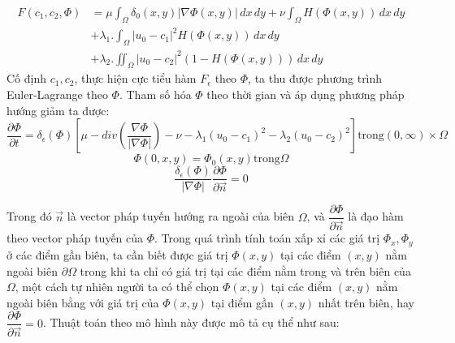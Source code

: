 \documentclass[12pt,oneside,a4]{report}
\begin{document}
\begin{equation}
\begin{split}
F(c_1, c_2, \Phi)&=\mu \int_{\Omega}\delta_0(x,y)|\nabla \Phi(x,y)|\,dx\,dy+\nu  \int_{\Omega}H( \Phi(x,y))\,dx\,dy \\ 
&+\lambda_1 .\int_{\Omega} |u_0-c_1|^2H(\Phi(x,y)) \,dx\,dy\\&+\lambda_2 .\iint_{\Omega} |u_0-c_2|^2(1-H(\Phi(x,y))) \,dx\,dy
\end{split}
\end{equation}
Cố định $c_1, c_2$, thực hiện cực tiểu hàm $F_{\epsilon}$ theo $\Phi$, ta thu được phương trình Euler-Lagrange theo $\Phi$. Tham số hóa $\Phi$ theo thời gian và áp dụng phương pháp hướng giảm ta được:
\begin{equation}
\dfrac{\partial \Phi}{\partial t}= \delta_{\epsilon}(\Phi)[\mu- div(\dfrac{\nabla \Phi}{|\nabla \Phi|})- \nu- \lambda_1 (u_0-c_1)^2-\lambda_2 (u_0-c_2)^2]  \text{trong} (0,\infty)\times \Omega
\end{equation}
\begin{equation}
\Phi(0,x,y)=\Phi_0(x,y) \text{trong} \Omega 
\end{equation}
\begin{equation}
\dfrac{\delta_{\epsilon}(\Phi)}{|\nabla \Phi|}\dfrac{\partial \Phi}{\partial \vec{n}}=0
\end{equation}

Trong đó $\vec{n}$ là vector pháp tuyến hướng ra ngoài của biên $\Omega$, và $\dfrac{\partial \Phi}{\partial \vec{n}} $ là đạo hàm theo vector pháp tuyến của $\Phi$. Trong quá trình tính toán xấp xỉ các giá trị $\Phi_x, \Phi_y$ ở các điểm gần biên, ta cần biết được giá trị $\Phi(x,y)$ tại các điểm $(x, y)$ nằm ngoài biên $\partial \Omega$ trong khi ta chỉ có giá trị tại các điểm nằm trong và trên biên của $\Omega$, một cách tự nhiên người ta có thể chọn $\Phi(x,y)$ tại các điểm $(x, y)$ nằm ngoài biên bằng với giá trị của $\Phi(x,y)$ tại điểm gần $(x,y)$  nhất trên biên, hay $\dfrac{\partial \Phi}{\partial \vec{n}}=0$. Thuật toán theo mô hình này được mô tả cụ thể như sau:
\end{document}
